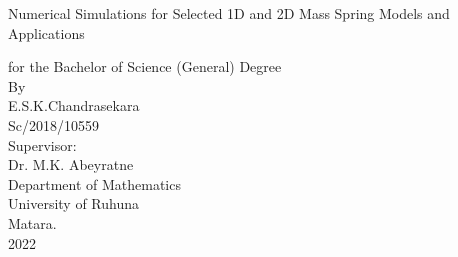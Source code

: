 \thispagestyle{empty}
\begin{center}
\vspace*{1cm}
{\huge Numerical Simulations for Selected 1D and 2D Mass Spring Models and Applications }

\vspace*{1.5cm}
\large { for the Bachelor of Science (General) Degree \\By\\E.S.K.Chandrasekara\\Sc/2018/10559}\\
\vspace{1.3cm}
\large {Supervisor:\\ Dr. M.K. Abeyratne }\\
\vspace{1.9cm}
\large{Department of Mathematics}\\
\large{University of Ruhuna}\\
\large{Matara.}\\
\vspace{0.5cm}
\large{2022}
\end{center}




